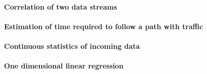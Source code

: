 \paragraph{Correlation of two data streams}


\paragraph{Estimation of time required to follow a path with traffic}


\paragraph{Continuous statistics of incoming data}



\paragraph{One dimensional linear regression}






